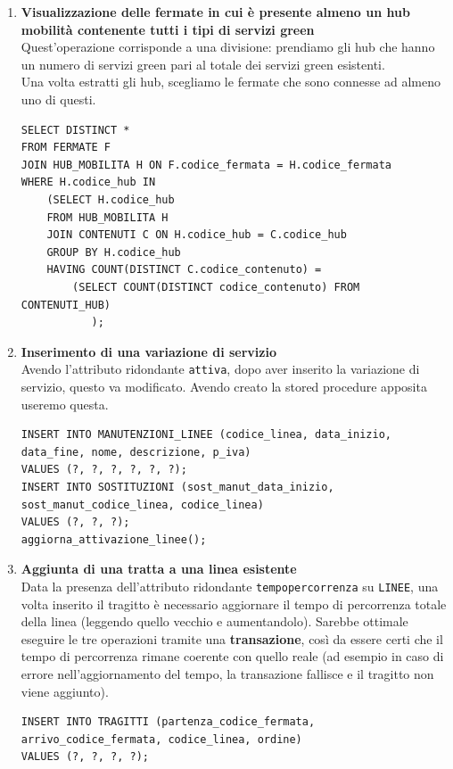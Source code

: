 \documentclass[12pt,a4paper]{report}
\begin{document}
\begin{enumerate}[label=\textbf{\arabic*)}]
\item \textbf{Visualizzazione delle fermate in cui è presente almeno un hub mobilità contenente tutti i tipi di servizi green} \\
Quest'operazione corrisponde a una divisione: prendiamo gli hub che hanno un numero di servizi green pari al totale dei servizi green esistenti. \\
Una volta estratti gli hub, scegliamo le fermate che sono connesse ad almeno uno di questi.
\begin{lstlisting}[style=sqlstyle]
SELECT DISTINCT *
FROM FERMATE F
JOIN HUB_MOBILITA H ON F.codice_fermata = H.codice_fermata
WHERE H.codice_hub IN
	(SELECT H.codice_hub
	FROM HUB_MOBILITA H
	JOIN CONTENUTI C ON H.codice_hub = C.codice_hub
	GROUP BY H.codice_hub
	HAVING COUNT(DISTINCT C.codice_contenuto) =
		(SELECT COUNT(DISTINCT codice_contenuto) FROM CONTENUTI_HUB)
           );
\end{lstlisting}

\item \textbf{Inserimento di una variazione di servizio} \\
Avendo l'attributo ridondante \texttt{attiva}, dopo aver inserito la variazione di servizio, questo va modificato. Avendo creato la stored procedure apposita useremo questa.
\begin{lstlisting}[style=sqlstyle, caption=Insert into SOSTITUZIONI and Update LINEE status]
INSERT INTO MANUTENZIONI_LINEE (codice_linea, data_inizio, data_fine, nome, descrizione, p_iva)
VALUES (?, ?, ?, ?, ?, ?);
INSERT INTO SOSTITUZIONI (sost_manut_data_inizio, sost_manut_codice_linea, codice_linea)
VALUES (?, ?, ?);
aggiorna_attivazione_linee();
\end{lstlisting}

\item \textbf{Aggiunta di una tratta a una linea esistente} \\
Data la presenza dell'attributo ridondante \texttt{tempo{\textunderscore}percorrenza} su \texttt{LINEE}, una volta inserito il tragitto è necessario aggiornare il tempo di percorrenza totale della linea (leggendo quello vecchio e aumentandolo). Sarebbe ottimale eseguire le tre operazioni tramite una \textbf{transazione}, così da essere certi che il tempo di percorrenza rimane coerente con quello reale (ad esempio in caso di errore nell'aggiornamento del tempo, la transazione fallisce e il tragitto non viene aggiunto). \\
\begin{lstlisting}[style=sqlstyle, caption=Inserimento del tragitto]
INSERT INTO TRAGITTI (partenza_codice_fermata, arrivo_codice_fermata, codice_linea, ordine)
VALUES (?, ?, ?, ?);
\end{lstlisting}


\end{enumerate}
\end{document}
